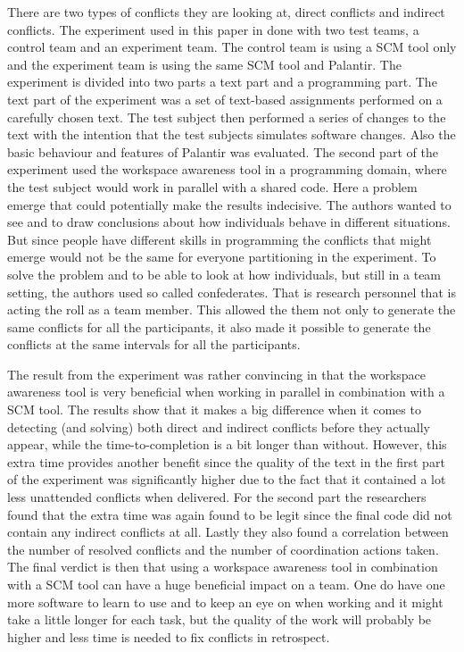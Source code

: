 \documentclass[a4paper]{article}
\begin{document}
There are two types of conflicts they are looking at, direct conflicts and indirect conflicts. 
The experiment used in this paper in done with two test teams, a control team and an experiment team. The control team is using a SCM tool only and the experiment team is using the same SCM tool and Palantir. The experiment is divided into two parts a text part and a programming part. The text part of the experiment was a set of text-based assignments performed on a carefully chosen text. The test subject then performed a series of changes to the text with the intention that the test subjects simulates software changes. Also the basic behaviour and features of Palantir was evaluated. The second part of the experiment used the workspace awareness tool in a programming domain, where the test subject would work in parallel with a shared code. Here a problem emerge that could potentially make the results indecisive. The authors wanted to see and to draw conclusions about how individuals behave in different situations. But since people have different skills in programming the conflicts that might emerge would not be the same for everyone partitioning in the experiment. To solve the problem and to be able to look at how individuals, but still in a team setting, the authors used so called confederates. That is research personnel that is acting the roll as a team member. This allowed the them not only to generate the same conflicts for all the participants, it also made it possible to generate the conflicts at the same intervals for all the participants.

The result from the experiment was rather convincing in that the workspace awareness tool is very beneficial when working in parallel in combination with a SCM tool. The results show that it makes a big difference when it comes to detecting (and solving) both direct and indirect conflicts before they actually appear, while the time-to-completion is a bit longer than without. However, this extra time provides another benefit since the quality of the text in the first part of the experiment was significantly higher due to the fact that it contained a lot less unattended conflicts when delivered. For the second part the researchers found that the extra time was again found to be legit since the final code did not contain any indirect conflicts at all. Lastly they also found a correlation between the number of resolved conflicts and the number of coordination actions taken. The final verdict is then that using a workspace awareness tool in combination with a SCM tool can have a huge beneficial impact on a team. One do have one more software to learn to use and to keep an eye on when working and it might take a little longer for each task, but the quality of the work will probably be higher and less time is needed to fix conflicts in retrospect.
\end{document}
